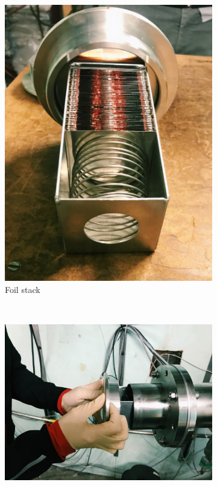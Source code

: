 \documentclass[a4paper,11pt,twoside]{book}
\begin{document}
\begin{figure}
    \centering
    \begin{subfigure}[b]{0.3\textwidth}
        \includegraphics[width=\textwidth]{Experiment/stack.JPG}
        \caption{Foil stack}
        \label{fig:stack}
    \end{subfigure}
    ~ %
    \begin{subfigure}[b]{0.3\textwidth}
        \includegraphics[width=\textwidth]{Experiment/tube.JPG}

\end{subfigure}
\end{figure}
\end{document}
